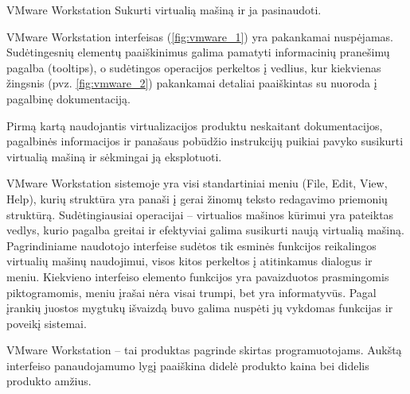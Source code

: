 \begin{xcase}{VMware Workstation}
  \xcgoal
  {
    Sukurti virtualią mašiną ir ja pasinaudoti.
  }
  
  \xctools
  {
    VMware Workstation interfeisas (\ref{fig:vmware_1}) yra pakankamai nuspėjamas. Sudėtingesnių elementų 
    paaiškinimus galima pamatyti informacinių pranešimų pagalba (tooltips), o sudėtingos
    operacijos perkeltos į vedlius, kur kiekvienas žingsnis (pvz. \ref{fig:vmware_2}) pakankamai detaliai 
    paaiškintas su nuoroda į pagalbinę dokumentaciją.
  }
  
  \xcresult
  {
    Pirmą kartą naudojantis virtualizacijos produktu neskaitant dokumentacijos, pagalbinės
    informacijos ir panašaus pobūdžio instrukcijų puikiai pavyko susikurti virtualią mašiną
    ir sėkmingai ją eksplotuoti.
  }
  
  \xcprinciples
  {
    {
      VMware Workstation sistemoje yra visi standartiniai meniu (File, Edit, View, Help), kurių
      struktūra yra panaši į gerai žinomų teksto redagavimo priemonių struktūrą.
    }
    {
      Sudėtingiausiai operacijai – virtualios mašinos kūrimui yra pateiktas vedlys, kurio
      pagalba greitai ir efektyviai galima susikurti naują virtualią mašiną.
    }
    {
      Pagrindiniame naudotojo interfeise sudėtos tik esminės funkcijos reikalingos virtualių
      mašinų naudojimui, visos kitos perkeltos į atitinkamus dialogus ir meniu.
    }
    {
      Kiekvieno interfeiso elemento funkcijos yra pavaizduotos prasmingomis piktogramomis, meniu
      įrašai nėra visai trumpi, bet yra informatyvūs.
    }
    {
      Pagal įrankių juostos mygtukų išvaizdą buvo galima nuspėti jų vykdomas funkcijas ir 
      poveikį sistemai.
    }
  }
  
  \xcthoughts
  {
    VMware Workstation – tai produktas pagrinde skirtas programuotojams. Aukštą interfeiso
    panaudojamumo lygį paaiškina didelė produkto kaina bei didelis produkto amžius.
  }
\end{xcase}
